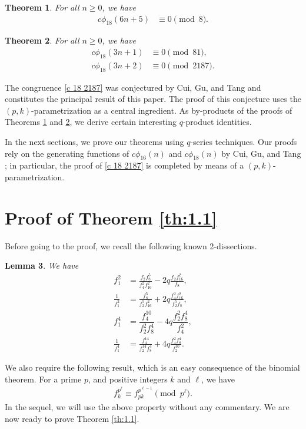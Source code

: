 \documentclass[12pt]{article}
\numberwithin{equation}{section}
\theoremstyle{plain}
\newtheorem{theorem}{Theorem}
\numberwithin{theorem}{section}
\newtheorem{lemma}[theorem]{Lemma}
\theoremstyle{definition}
\theoremstyle{remark}
\begin{document}
	
	\begin{theorem}\label{thm 18 2 power}
		For all $n\ge0$, we have
		\begin{align}
			c\phi_{18}\left(6n+5\right)&\equiv 0\pmod{8}.\label{cong: mod 8}
		\end{align}   
	\end{theorem}
	\begin{theorem}\label{thm 18 3 power}
		For all $n\ge0$, we have
		\begin{align}
			\label{c 18 81}c\phi_{18}\left(3n+1\right)&\equiv 0\pmod{81},\\
			\label{c 18 2187}c\phi_{18}\left(3n+2\right)&\equiv 0\pmod{2187}.
		\end{align}   
	\end{theorem}
    \noindent The congruence \eqref{c 18 2187} was conjectured by Cui, Gu, and Tang \cite{CGT25} and constitutes the principal result of this paper. The proof of this conjecture uses the $(p,k)$-parametrization as a central ingredient. As by-products of the proofs of Theorems \ref{thm 18 2 power} and \ref{thm 18 3 power}, we derive certain interesting $q$-product identities.

    In the next sections, we prove our theorems using $q$-series techniques. Our proofs rely on the generating functions of $c\phi_{16}(n)$ and $c\phi_{18}(n)$ by Cui, Gu, and Tang \cite{CGT25}; in particular, the proof of \eqref{c 18 2187} is completed by means of a $(p,k)$-parametrization.
	\section{Proof of Theorem \ref{th:1.1}}
	Before going to the proof, we recall the following known 2-dissections.
	\begin{lemma}\cite[Lemma 2]{matching}\label{lem-2-dis}
		We have
		\begin{align}
            f_{1}^2 &= \frac{f_{2}f_{8}^5}{f_{4}^2f_{16}^2} - 2 q \frac{f_{2} f_{16}^2}{f_{8}},\label{disf1^2}\\
            \frac{1}{f_{1}^2} &= \frac{f_{8}^5}{f_{2}^5 f_{16}^2} + 2 q \frac{f_{4}^2 f_{16}^2 }{f_{2}^5 f_{8}},\label{dis1byf1^2}\\
			f_1^4&=\dfrac{f_4^{10}}{f_2^2f_8^4}-4q\dfrac{f_2^2f_8^4}{f_4^2}\label{f_1^4},\\
			\frac{1}{f_{1}^4} &= \frac{f_{4}^{14}}{f_{2}^{14} f_{8}^4} + 4 q \frac{f_{4}^2 f_{8}^4}{f_{2}^{10}}.\label{dis1byf1^4}
		\end{align}
	\end{lemma}
    We also require the following result, which is an easy consequence of the binomial theorem. For a prime $p$, and positive integers $k$ and $\ell$, we have
\begin{align}\label{cong-modp}
	f_{k}^{p^\ell} \equiv f_{pk}^{p^{\ell-1}} \pmod{p^\ell}.
\end{align}
In the sequel, we will use the above property without any commentary. We are now ready to prove Theorem \ref{th:1.1}.
\end{document}
